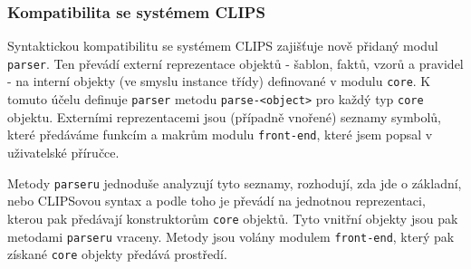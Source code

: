 \subsubsection{Kompatibilita se systémem CLIPS}
Syntaktickou kompatibilitu se systémem CLIPS zajišťuje nově přidaný modul
\verb|parser|.  Ten převádí externí reprezentace objektů - šablon, faktů, vzorů
a pravidel - na interní objekty (ve smyslu instance třídy) definované v modulu
\verb|core|.  K tomuto účelu definuje \verb|parser| metodu \verb|parse-<object>|
pro každý typ \verb|core| objektu. Externími reprezentacemi jsou (případně
vnořené) seznamy symbolů, které předáváme funkcím a makrům modulu
\verb|front-end|, které jsem popsal v uživatelské příručce.

Metody \verb|parseru| jednoduše analyzují tyto seznamy, rozhodují, zda jde o
základní, nebo CLIPSovou syntax a podle toho je převádí na jednotnou
reprezentaci, kterou pak předávají konstruktorům \verb|core| objektů. Tyto
vnitřní objekty jsou pak metodami \verb|parseru| vraceny. Metody jsou volány
modulem \verb|front-end|, který pak získané \verb|core| objekty předává
prostředí.
